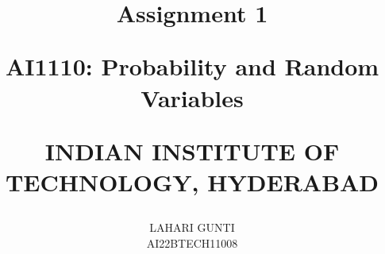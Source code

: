 \documentclass[journal,12pt,onecolumn]{IEEEtran}
\begin{document}
 \let\vec\mathbf 
  
  
  
  
 \vspace{3cm} 
  
 \title{ Assignment 1 
  
         \Large AI1110: Probability and Random Variables 
  
          INDIAN INSTITUTE OF TECHNOLOGY, HYDERABAD 
 } 
 \author{ LAHARI GUNTI 
          
         AI22BTECH11008 
 } 
  
 \maketitle 
  
\end{document}
